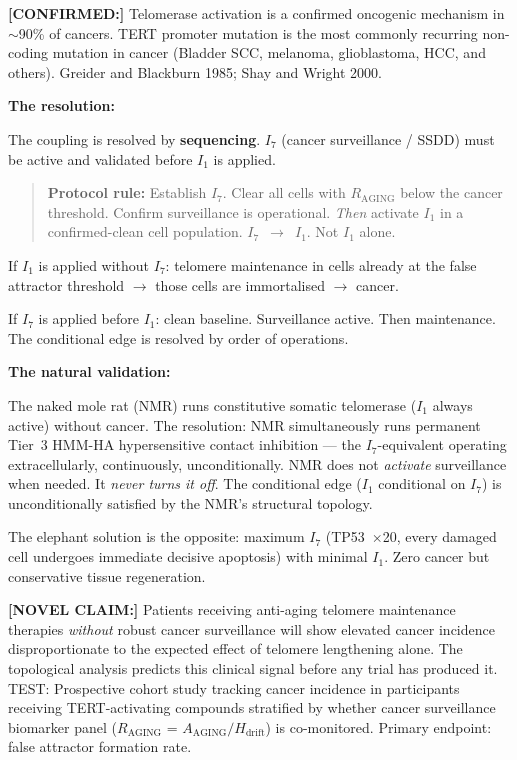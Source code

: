 \documentclass[12pt,a4paper]{article}
\newcommand{\raging}{$R_{\mathrm{AGING}}$}
\newcommand{\novel}[1]{\noindent\colorbox{yellow!18}{\parbox{\dimexpr\linewidth-2\fboxsep}{%
  \textbf{[NOVEL CLAIM:]} #1}}\vspace{0.4em}}
\newcommand{\confirmed}[1]{\noindent\colorbox{green!10}{\parbox{\dimexpr\linewidth-2\fboxsep}{%
  \textbf{[CONFIRMED:]} #1}}\vspace{0.4em}}
\newcommand{\Inet}[1]{$I_{#1}$}
\begin{document}
\confirmed{Telomerase activation is a confirmed oncogenic mechanism in
$\sim$90\% of cancers. TERT promoter mutation is the most commonly recurring
non-coding mutation in cancer (Bladder SCC, melanoma, glioblastoma, HCC, and
others). Greider and Blackburn 1985; Shay and Wright 2000.}

\textbf{The resolution:}

The coupling is resolved by \textbf{sequencing}. \Inet{7} (cancer surveillance /
SSDD) must be active and validated before \Inet{1} is applied.

\begin{quote}
\textbf{Protocol rule:} Establish \Inet{7}. Clear all cells with
\raging{} below the cancer threshold. Confirm surveillance is operational.
\textit{Then} activate \Inet{1} in a confirmed-clean cell population.
\Inet{7}~$\to$~\Inet{1}. Not \Inet{1} alone.
\end{quote}

If \Inet{1} is applied without \Inet{7}: telomere maintenance in cells
already at the false attractor threshold $\to$ those cells are immortalised
$\to$ cancer.

If \Inet{7} is applied before \Inet{1}: clean baseline. Surveillance active.
Then maintenance. The conditional edge is resolved by order of operations.

\textbf{The natural validation:}

The naked mole rat (NMR) runs constitutive somatic telomerase (\Inet{1}
always active) without cancer. The resolution: NMR simultaneously runs
permanent Tier~3 HMM-HA hypersensitive contact inhibition --- the
\Inet{7}-equivalent operating extracellularly, continuously, unconditionally.
NMR does not \textit{activate} surveillance when needed. It \textit{never
turns it off}. The conditional edge (\Inet{1} conditional on \Inet{7}) is
unconditionally satisfied by the NMR's structural topology.

The elephant solution is the opposite: maximum \Inet{7} (TP53~$\times$20,
every damaged cell undergoes immediate decisive apoptosis) with minimal
\Inet{1}. Zero cancer but conservative tissue regeneration.

\novel{Patients receiving anti-aging telomere maintenance therapies
\textit{without} robust cancer surveillance will show elevated cancer
incidence disproportionate to the expected effect of telomere lengthening
alone. The topological analysis predicts this clinical signal before any
trial has produced it. TEST: Prospective cohort study tracking cancer
incidence in participants receiving TERT-activating compounds stratified by
whether cancer surveillance biomarker panel (\raging{} = $A_{\mathrm{AGING}}
/ H_{\mathrm{drift}}$) is co-monitored. Primary endpoint: false attractor
formation rate.}
\end{document}
